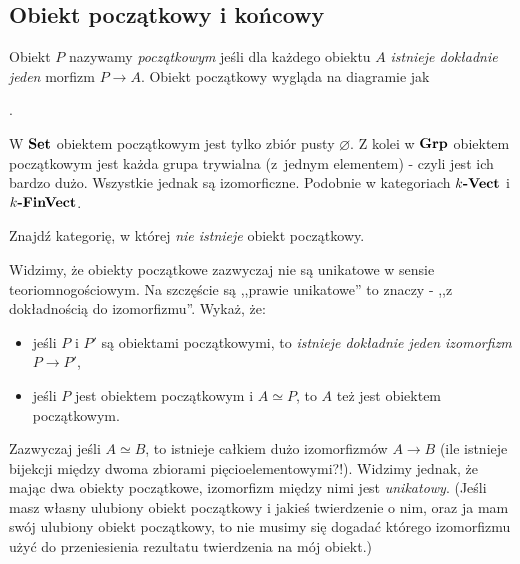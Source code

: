 \subsection{Obiekt początkowy i końcowy}
\begin{defn}
  Obiekt $P$ nazywamy \emph{początkowym} jeśli dla każdego obiektu $A$ \emph{istnieje dokładnie jeden} morfizm $P\to A$. Obiekt początkowy wygląda na diagramie jak .
\end{defn}

\begin{exmp}
  W $\textbf{Set}$ obiektem początkowym jest tylko zbiór pusty $\varnothing$. Z kolei w $\textbf{Grp}$ obiektem początkowym jest każda grupa trywialna (z~jednym elementem) - czyli jest ich bardzo dużo. Wszystkie jednak są izomorficzne. Podobnie w kategoriach $k\textbf{-Vect}$ i $k\textbf{-FinVect}$.
\end{exmp}

\begin{exc}
	Znajdź kategorię, w której \emph{nie istnieje} obiekt początkowy.
\end{exc}

\begin{exc}
	Widzimy, że obiekty początkowe zazwyczaj nie są unikatowe w sensie teoriomnogościowym. Na szczęście są ,,prawie unikatowe'' to znaczy - ,,z dokładnością do izomorfizmu''. Wykaż, że:
	\begin{itemize}
		\item jeśli $P$ i $P'$ są obiektami początkowymi, to \emph{istnieje dokładnie jeden izomorfizm} $P\to P'$,
		\item jeśli $P$ jest obiektem początkowym i $A\simeq P$, to $A$ też jest obiektem początkowym.
	\end{itemize}
\end{exc}

\begin{remk}
	Zazwyczaj jeśli $A\simeq B$, to istnieje całkiem dużo izomorfizmów $A\to B$ (ile istnieje bijekcji między dwoma zbiorami pięcioelementowymi?!). Widzimy jednak, że mając dwa obiekty początkowe, izomorfizm między nimi jest \emph{unikatowy}.
	(Jeśli masz własny ulubiony obiekt początkowy i jakieś twierdzenie o nim, oraz ja mam swój ulubiony obiekt początkowy, to nie musimy się dogadać którego izomorfizmu użyć do przeniesienia rezultatu twierdzenia na mój obiekt.)
\end{remk}

